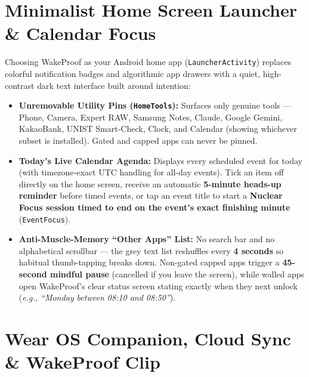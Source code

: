 \documentclass[11pt,a4paper]{article}
\begin{document}
\section{Minimalist Home Screen Launcher \& Calendar Focus}

Choosing WakeProof as your Android home app (\texttt{LauncherActivity}) replaces colorful notification badges and algorithmic app drawers with a quiet, high-contrast dark text interface built around intention:
\begin{itemize}
  \item \textbf{Unremovable Utility Pins (\texttt{HomeTools}):} Surfaces only genuine tools --- Phone, Camera, Expert RAW, Samsung Notes, Claude, Google Gemini, KakaoBank, UNIST Smart-Check, Clock, and Calendar (showing whichever subset is installed). Gated and capped apps can never be pinned.
  \item \textbf{Today's Live Calendar Agenda:} Displays every scheduled event for today (with timezone-exact UTC handling for all-day events). Tick an item off directly on the home screen, receive an automatic \textbf{5-minute heads-up reminder} before timed events, or tap an event title to start a \textbf{Nuclear Focus session timed to end on the event's exact finishing minute} (\texttt{EventFocus}).
  \item \textbf{Anti-Muscle-Memory ``Other Apps'' List:} No search bar and no alphabetical scrollbar --- the grey text list reshuffles every \textbf{4 seconds} so habitual thumb-tapping breaks down. Non-gated capped apps trigger a \textbf{45-second mindful pause} (cancelled if you leave the screen), while walled apps open WakeProof's clear status screen stating exactly when they next unlock (\emph{e.g., ``Monday between 08:10 and 08:50''}).
\end{itemize}

\section{Wear OS Companion, Cloud Sync \& WakeProof Clip}
\end{document}
